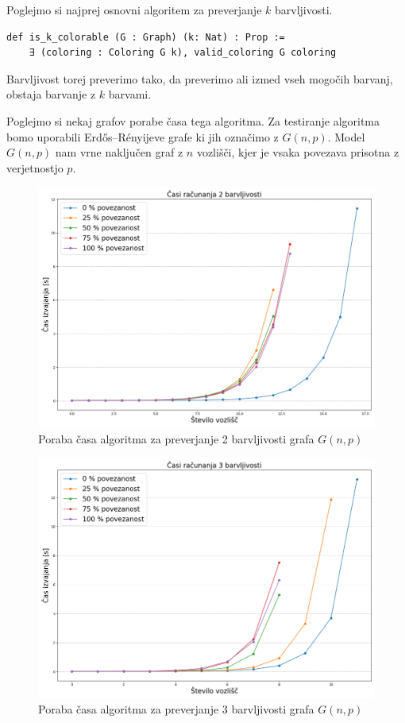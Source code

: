 \documentclass[mat1]{fmfdelo}
\begin{document}
Poglejmo si najprej osnovni algoritem za preverjanje $k$ barvljivosti.
\begin{lstlisting}
def is_k_colorable (G : Graph) (k: Nat) : Prop :=
    ∃ (coloring : Coloring G k), valid_coloring G coloring
\end{lstlisting}

Barvljivost torej preverimo tako, da preverimo ali izmed vseh mogočih barvanj, obstaja barvanje z $k$ barvami.

Poglejmo si nekaj grafov porabe časa tega algoritma. Za testiranje algoritma bomo uporabili Erdős–Rényijeve grafe
ki jih označimo z $G(n, p)$. Model $G(n, p)$ nam vrne naključen graf z $n$ vozlišči, kjer je vsaka povezava prisotna z verjetnostjo $p$.

\begin{figure}[H]
\begin{center}
\includegraphics[scale=0.35]{assets/2barvSlow}
\caption{Poraba časa algoritma za preverjanje 2 barvljivosti grafa $G(n, p)$}
\label{slika2}
\end{center}
\end{figure}

\begin{figure}[H]
\begin{center}
\includegraphics[scale=0.35]{assets/3barvSlow}
\caption{Poraba časa algoritma za preverjanje 3 barvljivosti grafa $G(n, p)$}
\label{slika2}
\end{center}
\end{figure}
\end{document}
